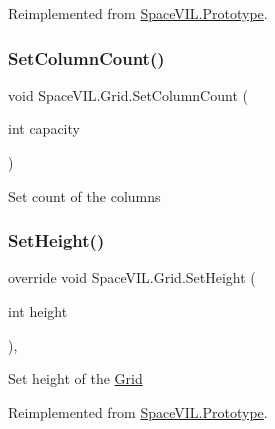 Reimplemented from \mbox{\hyperlink{class_space_v_i_l_1_1_prototype_a7a2aabccfe6389f71d0265fa73f0ae87}{Space\+V\+I\+L.\+Prototype}}.

\mbox{\label{class_space_v_i_l_1_1_grid_a601c091730701ac3e117396686c9904d}} 
\subsubsection{\texorpdfstring{Set\+Column\+Count()}{SetColumnCount()}}
{\footnotesize\ttfamily void Space\+V\+I\+L.\+Grid.\+Set\+Column\+Count (\begin{DoxyParamCaption}\item[{int}]{capacity }\end{DoxyParamCaption})\hspace{0.3cm}{\ttfamily [inline]}}



Set count of the columns 

\mbox{\label{class_space_v_i_l_1_1_grid_a64c7b1987fb8823330dbeaea7420369c}} 
\subsubsection{\texorpdfstring{Set\+Height()}{SetHeight()}}
{\footnotesize\ttfamily override void Space\+V\+I\+L.\+Grid.\+Set\+Height (\begin{DoxyParamCaption}\item[{int}]{height }\end{DoxyParamCaption})\hspace{0.3cm}{\ttfamily [inline]}, {\ttfamily [virtual]}}



Set height of the \mbox{\hyperlink{class_space_v_i_l_1_1_grid}{Grid}} 



Reimplemented from \mbox{\hyperlink{class_space_v_i_l_1_1_prototype_adc0adcbd1c3800d9525798ba7be5832a}{Space\+V\+I\+L.\+Prototype}}.

\mbox{\label{class_space_v_i_l_1_1_grid_a62b1f61a50a5cceefcee8c881f92e641}} 
